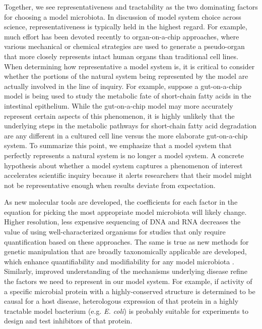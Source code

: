 \documentclass[11pt,twocolumn,notitlepage,openany,twoside]{book}
\begin{document}
\begin{refsection}
Together, we see representativeness and tractability as the two dominating factors for choosing a model microbiota. In discussion of model system choice across science, representativeness is typically held in the highest regard. For example, much effort has been devoted recently to organ-on-a-chip approaches, where various mechanical or chemical strategies are used to generate a pseudo-organ that more closely represents intact human organs than traditional cell lines. When determining how representative a model system is, it is critical to consider whether the portions of the natural system being represented by the model are actually involved in the line of inquiry. For example, suppose a gut-on-a-chip model is being used to study the metabolic fate of short-chain fatty acids in the intestinal epithelium. While the gut-on-a-chip model may more accurately represent certain aspects of this phenomenon, it is highly unlikely that the underlying steps in the metabolic pathways for short-chain fatty acid degradation are any different in a cultured cell line versus the more elaborate gut-on-a-chip system. To summarize this point, we emphasize that a model system that perfectly represents a natural system is no longer a model system. A concrete hypothesis about whether a model system captures a phenomenon of interest accelerates scientific inquiry because it alerts researchers that their model might not be representative enough when results deviate from expectation.

As new molecular tools are developed, the coefficients for each factor in the equation for picking the most appropriate model microbiota will likely change. Higher resolution, less expensive sequencing of DNA and RNA decreases the value of using well-characterized organisms for studies that only require quantification based on these approaches. The same is true as new methods for genetic manipulation that are broadly taxonomically applicable are developed, which enhance quantifiability and modifiability for any model microbiota \cite{Leonard2018-pq}. Similarly, improved understanding of the mechanisms underlying disease refine the factors we need to represent in our model system. For example, if activity of a specific microbial protein with a highly-conserved structure is determined to be causal for a host disease, heterologous expression of that protein in a highly tractable model bacterium (e.g. \textit{E. coli}) is probably suitable for experiments to design and test inhibitors of that protein.


\end{refsection}
\end{document}
